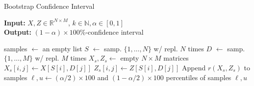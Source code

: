 \begin{algorithm}[t]
{
\small
\caption{Bootstrap Confidence Interval}
\label{alg:ci}
\hspace*{\algorithmicindent} \textbf{Input:} $X, Z \in \mathbb{R}^{N\times M}$, $k \in \mathbb{N}, \alpha \in [0, 1]$ \\
\hspace*{\algorithmicindent} \textbf{Output:} $(1-\alpha)\times 100\%$-confidence interval
\begin{algorithmic}[1]
\State samples $\gets$ an empty list
    \State $S$ $\gets$ samp. $\{1,\dots, N\}$ w/ repl. $N$ times
    \State $D$ $\gets$ samp. $\{1,\dots, M\}$ w/ repl. $M$ times
    \State $X_s, Z_s \gets$ empty $N \times M$ matrices
        \State $X_s[i, j] \gets X[S[i], D[j]]$
        \State $Z_s[i, j] \gets Z[S[i], D[j]]$
    \EndFor
    \State Append $r(X_s, Z_s)$ to samples
\EndFor
\State $\ell, u \gets (\alpha/2)\times 100$ and $(1-\alpha/2)\times 100$ percentiles of samples
\State \Return $\ell, u$
\end{algorithmic}
}
\end{algorithm}
